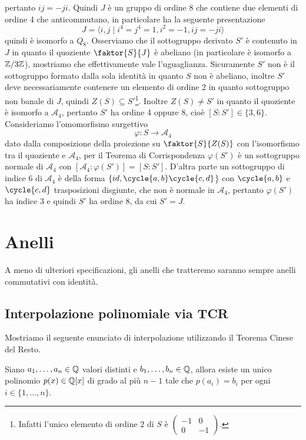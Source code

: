 \documentclass[11pt]{scrartcl}
\begin{document}
pertanto $ij = -ji$. Quindi $J$ è un gruppo di ordine $8$ che contiene due
elementi di ordine 4 che anticommutano, in particolare ha la seguente presentazione
\[
    J = \langle i, j\mid i^4 = j^4 = 1, i^2 = -1, ij = -ji\rangle
\]
quindi è isomorfo a $Q_8$. Osserviamo che il sottogruppo derivato $S'$ è 
contenuto in $J$ in quanto il quoziente $\faktor{S}{J}$ è abeliano (in particolare
è isomorfo a $\mathbb{Z}/{3}\mathbb{Z}$), mostriamo che effettivamente vale l'uguaglianza. 
Sicuramente $S'$ non è il sottogruppo formato dalla sola identità in quanto 
$S$ non è abeliano, inoltre $S'$ deve necessariamente contenere un elemento di 
ordine 2 in quanto sottogruppo non banale di $J$, quindi $Z(S) \subseteq S'$\footnote{
    Infatti l'unico elemento di ordine 2 di $S$ è $\begin{pmatrix}-1 & 0\\
    0 & -1\end{pmatrix}$.
}. Inoltre $Z(S) \neq S'$ in quanto il quoziente è isomorfo a $\mathcal{A}_4$,
pertanto $S'$ ha ordine 4 oppure 8, cioè $[S: S'] \in \{3, 6\}$.
Consideriamo l'omomorfismo surgettivo 
\[
    \varphi: S \longrightarrow \mathcal{A}_4
\]
dato dalla composizione della proiezione su $\faktor{S}{Z(S)}$ con l'isomorfismo
tra il quoziente e $\mathcal{A}_4$, per il Teorema di Corrispondenza $\varphi(S')$
è un sottogruppo normale di $\mathcal{A}_4$ con 
$[\mathcal{A}_4: \varphi(S')] = [S: S']$. D'altra parte un sottogruppo di 
indice 6 di $\mathcal{A}_4$ è della forma $\{id, \cycle{a, b}\cycle{c, d}$\}
con $\cycle{a, b}$ e $\cycle{c, d}$ trasposizioni disgiunte, che non è normale
in $\mathcal{A}_4$, pertanto $\varphi(S')$ ha indice 3 e quindi $S'$ ha ordine
8, da cui $S' = J$.


\newpage

\section{Anelli}

A meno di ulteriori specificazioni, gli anelli che tratteremo saranno sempre 
anelli commutativi con identità.

\subsection{Interpolazione polinomiale via TCR}

Mostriamo il seguente enunciato di interpolazione utilizzando il Teorema
Cinese del Resto.

\begin{proposition}
    Siano $a_1, \ldots, a_n \in \mathbb Q$ valori distinti e $b_1, \ldots, b_n \in \mathbb Q$,
    allora esiste un unico polinomio $p(x) \in \mathbb Q[x]$ di grado al più $n - 1$
    tale che $p(a_i) = b_i$ per ogni $i \in \{1, \ldots, n\}$. 
\end{proposition}
\end{document}
